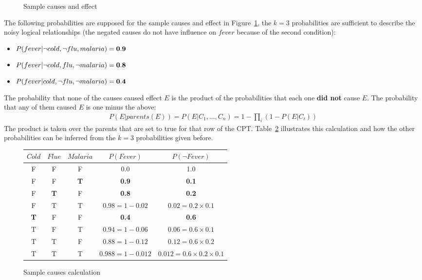 \documentclass{report}
\begin{document}
\begin{figure}[h!]
\centering
{}
\caption{Sample causes and effect}
\label{figure:noisyor}
\end{figure}

The following probabilities are supposed for the sample causes and effect in Figure~\ref{figure:noisyor}, the $k=3$ probabilities are sufficient to describe the noisy logical relationships (the negated causes do not have influence on $fever$ because of the second condition):
\begin{itemize}
\item $P(fever\vert \neg cold, \neg flu, malaria) = {\bf 0.9}$
\item $P(fever\vert \neg cold, flu, \neg malaria) = {\bf 0.8}$
\item $P(fever\vert cold, \neg flu, \neg malaria) = {\bf 0.4}$
\end{itemize}

The probability that none of the causes caused effect $E$ is the product of the probabilities that each one {\bf did not} cause $E$. The probability that any of them caused $E$ is one minus the above:
\begin{align*}
P(E\vert parents(E)) = P(E\vert C_1,...,C_n) = 1 - \prod_i (1 - P(E\vert C_i))
\end{align*}
The product is taken over the parents that are set to true for that row of the CPT.
Table~\ref{table:samplecauses} illustrates this calculation and how the other probabilities can be inferred from the $k=3$ probabilities given before.

\begin{figure}[h!]
\centering
\begin{tabular}{c|c|c||c||c}
$Cold$ & $Flue$ & $Malaria$ & $P(Fever)$ & $P(\neg Fever)$ \\
\hline
\hline
F & F & F & 0.0 & 1.0 \\
F & F & {\bf T} & {\bf 0.9} & {\bf 0.1} \\
F & {\bf T} & F & {\bf 0.8} & {\bf 0.2} \\
F & T & T & $0.98 = 1 - 0.02$ & $0.02 = 0.2 \times 0.1$ \\
{\bf T} & F & F & {\bf 0.4} & {\bf 0.6} \\
T & F & T & $0.94 = 1 - 0.06$ & $0.06 = 0.6 \times 0.1$ \\
T & T & F & $0.88 = 1 - 0.12$ & $0.12 = 0.6 \times 0.2$ \\
T & T & T & $0.988 = 1 - 0.012$ & $0.012 = 0.6 \times 0.2 \times 0.1$
\end{tabular}
\caption{Sample causes calculation}
\label{table:samplecauses}
\end{figure}
\end{document}
